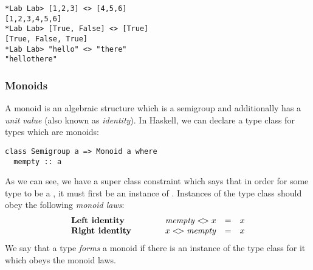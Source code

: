 
\begin{verbatim}
*Lab Lab> [1,2,3] <> [4,5,6]      
[1,2,3,4,5,6]
*Lab Lab> [True, False] <> [True] 
[True, False, True]
*Lab Lab> "hello" <> "there" 
"hellothere"
\end{verbatim}

\taskLine 

\subsubsection{Monoids}

A monoid is an algebraic structure which is a semigroup and additionally has a \emph{unit value} (also known as \emph{identity}). In Haskell, we can declare a type class for types which are monoids:
\begin{verbatim}
class Semigroup a => Monoid a where
  mempty :: a
\end{verbatim}
As we can see, we have a super class constraint which says that in order for some type  to be a , it must first be an instance of . Instances of the  type class should obey the following \emph{monoid laws}:
\begin{displaymath}
\begin{array}{lcrcl}
\textbf{Left identity} &\qquad & \mathit{mempty} <\!> x & = & x \\
\textbf{Right identity} &\qquad & x <\!> \mathit{mempty} & = & x 
\end{array}
\end{displaymath}
We say that a type \emph{forms} a monoid if there is an instance of the  type class for it which obeys the monoid laws. 



